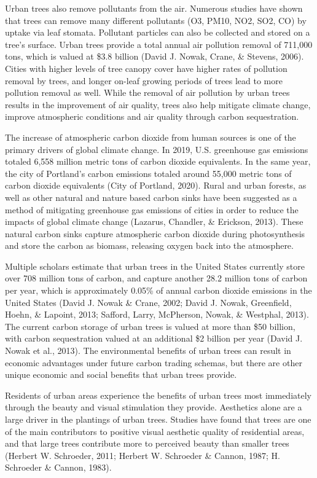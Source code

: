 \documentclass[12pt,twoside]{reedthesis}
\begin{document}
Urban trees also remove pollutants from the air. Numerous studies have shown that trees can remove many different pollutants (O3, PM10, NO2, SO2, CO) by uptake via leaf stomata. Pollutant particles can also be collected and stored on a tree's surface. Urban trees provide a total annual air pollution removal of 711,000 tons, which is valued at \$3.8 billion (David J. Nowak, Crane, \& Stevens, 2006). Cities with higher levels of tree canopy cover have higher rates of pollution removal by trees, and longer on-leaf growing periods of trees lead to more pollution removal as well. While the removal of air pollution by urban trees results in the improvement of air quality, trees also help mitigate climate change, improve atmospheric conditions and air quality through carbon sequestration.

The increase of atmospheric carbon dioxide from human sources is one of the primary drivers of global climate change. In 2019, U.S. greenhouse gas emissions totaled 6,558 million metric tons of carbon dioxide equivalents. In the same year, the city of Portland's carbon emissions totaled around 55,000 metric tons of carbon dioxide equivalents (City of Portland, 2020). Rural and urban forests, as well as other natural and nature based carbon sinks have been suggested as a method of mitigating greenhouse gas emissions of cities in order to reduce the impacts of global climate change (Lazarus, Chandler, \& Erickson, 2013). These natural carbon sinks capture atmospheric carbon dioxide during photosynthesis and store the carbon as biomass, releasing oxygen back into the atmosphere.

Multiple scholars estimate that urban trees in the United States currently store over 708 million tons of carbon, and capture another 28.2 million tons of carbon per year, which is approximately 0.05\% of annual carbon dioxide emissions in the United States (David J. Nowak \& Crane, 2002; David J. Nowak, Greenfield, Hoehn, \& Lapoint, 2013; Safford, Larry, McPherson, Nowak, \& Westphal, 2013). The current carbon storage of urban trees is valued at more than \$50 billion, with carbon sequestration valued at an additional \$2 billion per year (David J. Nowak et al., 2013). The environmental benefits of urban trees can result in economic advantages under future carbon trading schemas, but there are other unique economic and social benefits that urban trees provide.

Residents of urban areas experience the benefits of urban trees most immediately through the beauty and visual stimulation they provide. Aesthetics alone are a large driver in the plantings of urban trees. Studies have found that trees are one of the main contributors to positive visual aesthetic quality of residential areas, and that large trees contribute more to perceived beauty than smaller trees (Herbert W. Schroeder, 2011; Herbert W. Schroeder \& Cannon, 1987; H. Schroeder \& Cannon, 1983).
\end{document}
